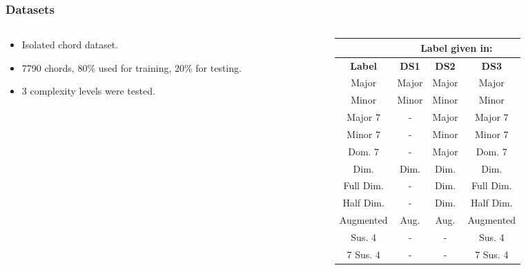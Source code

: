 \documentclass{beamer}
\begin{document}
\begin{frame}
	\frametitle{Datasets}
	\begin{columns}
	\begin{column}{.4\textwidth}
	\begin{itemize}
	\item Isolated chord dataset.
	\item 7790 chords, 80\% used for training, 20\% for testing.
 	\item 3 complexity levels were tested.
	\end{itemize}
	\end{column}
	\begin{column}{.6\textwidth}
	\begin{table}
	\small
\centering
\begin{tabular}{|c|c|c|c|} \hline
&\multicolumn{3}{|c|}{\textbf{Label given in:}} \\ \hline
\textbf{Label} & \textbf{DS1} & \textbf{DS2} & \textbf{DS3} \\ \hline
Major & Major & Major & Major \\ \hline
Minor & Minor & Minor & Minor \\ \hline
Major 7 & - & Major & Major 7 \\ \hline
Minor 7 & - & Minor & Minor 7 \\ \hline
Dom. 7 & - & Major & Dom. 7 \\ \hline
Dim. & Dim. & Dim. & Dim. \\ \hline
Full Dim. & - & Dim. & Full Dim. \\ \hline
Half Dim. & - & Dim. & Half Dim. \\ \hline
Augmented & Aug. & Aug. & Augmented \\ \hline
Sus. 4 & - & - & Sus. 4 \\ \hline
7 Sus. 4 & - & - & 7 Sus. 4 \\ \hline
\end{tabular}
\label{tab:tab1}
\end{table} 
\end{column}
\end{columns}
\end{frame}  
\end{document}
